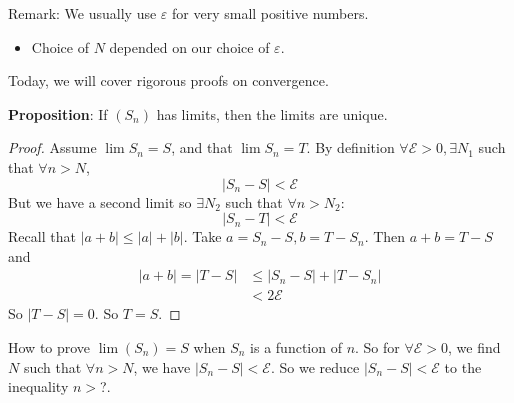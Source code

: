 \documentclass{report}
\begin{document}
Remark: We usually use $\varepsilon$ for very small positive numbers.
    \begin{itemize}
        \item Choice of $N$ depended on our choice of $\varepsilon$.
    \end{itemize}

Today, we will cover rigorous proofs on convergence. 

\textbf{Proposition}: If $(S_{n})$ has limits, then the limits are unique. 
    \begin{proof}
        Assume $\lim S_{n} = S$, and that $\lim S_{n} = T$. By definition $\forall \mathcal{E} > 0, \exists N_{1}$ such that $\forall n > N$, 
            \begin{equation*}
                \lvert S_{n} - S \rvert < \mathcal{E}
            \end{equation*}
        But we have a second limit so $\exists N_{2}$ such that $\forall n > N_{2}$:
            \begin{equation*}
                \lvert S_{n} - T \rvert < \mathcal{E}
            \end{equation*}
        Recall that $\lvert a + b \rvert \leq \lvert a \rvert + \lvert b \rvert$. Take $a = S_{n} - S, b = T - S_{n}$. Then $a + b = T - S$ and 
            \begin{align*}
                \lvert a + b \rvert = \lvert T - S \rvert &\leq \lvert S_{n} - S \rvert + \lvert T - S_{n} \rvert \\
                &< 2\mathcal{E}
            \end{align*}
        So $\lvert T - S \rvert = 0$. So $T = S$.
    \end{proof}

How to prove $\lim (S_{n}) = S$ when $S_{n}$ is a function of $n$. So for $\forall \mathcal{E} >  0$, we find $N$ such that $\forall n > N$, we have $\lvert S_{n} - S \rvert <  \mathcal{E}$. So we reduce $\lvert S_{n} - S \rvert <  \mathcal{E}$ to the inequality $n > $?.
\end{document}
